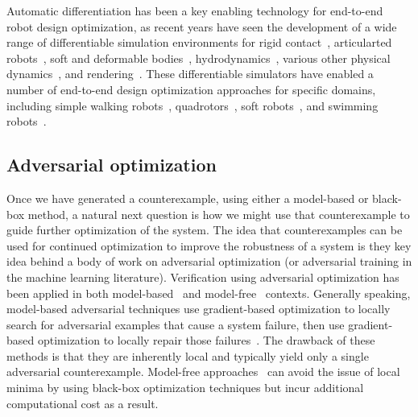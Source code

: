 Automatic differentiation has been a key enabling technology for end-to-end robot design optimization, as recent years have seen the development of a wide range of differentiable simulation environments for rigid contact~\cite{heiden2021neuralsim,belubute_peres_lcp_physics,qiaoDifferentiableSimulationSoft2021,howelllecleach2022}, articularted robots~\cite{qiaoEfficientDifferentiableSimulation2021}, soft and deformable bodies~\cite{huChainQueenRealTimeDifferentiable2019,chenDaxBenchBenchmarkingDeformable2023,qiaoDifferentiableSimulationSoft2021}, hydrodynamics~\cite{ma2021diffaqua,leeAquariumFullyDifferentiable2023}, various other physical dynamics~\cite{huDiffTaichiDifferentiableProgramming2019, kidgerNeuralDifferentialEquations2022, murthyGradSimDifferentiableSimulation2021}, and rendering~\cite{zhaoPhysicsbasedDifferentiableRendering2020,Jakob2020DrJit,lelidecDifferentiableRenderingPerturbed2021}.
%
These differentiable simulators have enabled a number of end-to-end design optimization approaches for specific domains, including simple walking robots~\cite{Schulz_robogami}, quadrotors~\cite{du2016computational}, soft robots~\cite{soft_robot_optimization_review,matthewsEfficientAutomaticDesign2023}, and swimming robots~\cite{du2021underwater,ma2021diffaqua}.

\subsection{Adversarial optimization}

Once we have generated a counterexample, using either a model-based or black-box method, a natural next question is how we might use that counterexample to guide further optimization of the system. The idea that counterexamples can be used for continued optimization to improve the robustness of a system is they key idea behind a body of work on adversarial optimization (or adversarial training in the machine learning literature). Verification using adversarial optimization has been applied in both model-based~\cite{dontiAdversariallyRobustLearning2021,yaghoubiGrayboxAdversarialTesting2018} and model-free~\cite{corsoSurveyAlgorithmsBlackBox2021} contexts. Generally speaking, model-based adversarial techniques use gradient-based optimization to locally search for adversarial examples that cause a system failure, then use gradient-based optimization to locally repair those failures~\cite{dontiAdversariallyRobustLearning2021}. The drawback of these methods is that they are inherently local and typically yield only a single adversarial counterexample. Model-free approaches~\cite{corsoSurveyAlgorithmsBlackBox2021} can avoid the issue of local minima by using black-box optimization techniques but incur additional computational cost as a result.


